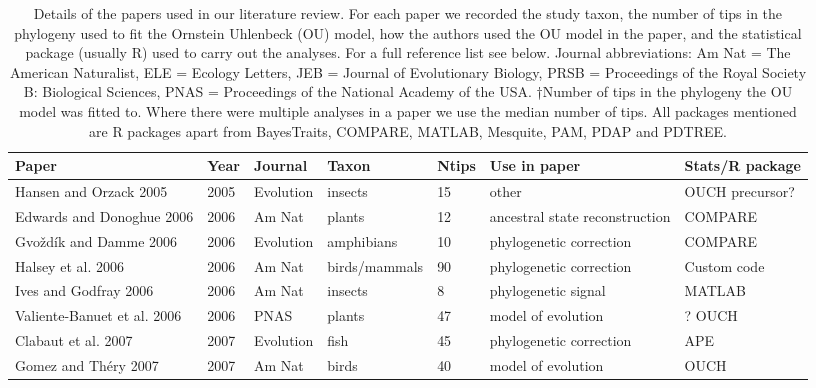 \documentclass[a4paper,12pt]{article}
\begin{document}
\begin{landscape}
\begin{center}

\LTcapwidth=25cm
\begin{longtable}{p{6cm}llllll}
\caption[Literature review]
        {Details of the papers used in our literature review. For each paper we recorded the study taxon, the number of tips in the phylogeny used to fit the Ornstein Uhlenbeck (OU) model, how the authors used the OU model in the paper, and the statistical package (usually R) used to carry out the analyses. For a full reference list see below. Journal abbreviations: Am Nat = The American Naturalist, ELE = Ecology Letters, JEB = Journal of Evolutionary Biology, PRSB = Proceedings of the Royal Society B: Biological Sciences, PNAS = Proceedings of the National Academy of the USA. †Number of tips in the phylogeny the OU model was fitted to. Where there were multiple analyses in a paper we use the median number of tips.  All packages mentioned are R packages apart from BayesTraits, COMPARE, MATLAB, Mesquite, PAM, PDAP and PDTREE.}\\
\bigskip        
\textbf{Paper}  &   \textbf{Year}    &   \textbf{Journal} &   \textbf{Taxon}   &   \textbf{Ntips}   &   \textbf{Use in paper}   &   \textbf{Stats/R package} \\
\hline
Hansen and Orzack 2005    &   2005    &   Evolution   &   insects &   15  &   other   &   OUCH precursor? \\
Edwards and Donoghue 2006     &   2006    &   Am Nat  &   plants  &   12  &   ancestral state reconstruction  &   COMPARE \\
Gvo\v{z}d\'{i}k and Damme 2006    &   2006    &   Evolution   &   amphibians  &   10  &   phylogenetic correction &   COMPARE \\
Halsey et al. 2006    &   2006    &   Am Nat  &   birds/mammals   &   90  &   phylogenetic correction &   Custom code \\
Ives and Godfray 2006 &   2006    &   Am Nat  &   insects &   8   &   phylogenetic signal &   MATLAB  \\
Valiente-Banuet et al. 2006   &   2006    &   PNAS    &   plants  &   47  &   model of evolution  &   ? OUCH    \\
Clabaut et al. 2007   &   2007    &   Evolution   &   fish    &   45  &   phylogenetic correction &   APE \\
Gomez and Th\'{e}ry 2007  &   2007    &   Am Nat  &   birds   &   40  &   model of evolution  &   OUCH    \\

\end{longtable}
\end{center}
\end{landscape}
\end{document}
